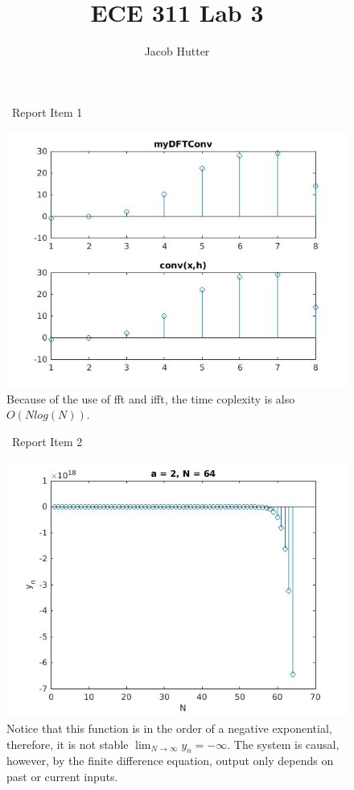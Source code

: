 \documentclass{article}
\author{Jacob Hutter}
\title{ECE 311 Lab 3}
\begin{document}
\maketitle

\begin{figure}[H]
\ Report Item 1

\includegraphics[scale = .5]{report1}
\\ Because of the use of fft and ifft, the time coplexity is also $O(Nlog(N))$.
\end{figure}



\begin{figure}[H]
\ Report Item 2

\includegraphics[scale = .5]{report2}
\\ Notice that this function is in the order of a negative exponential, 
therefore, it is not stable $\lim_{N\to\infty} y_n = -\infty$.
The system is causal, however, by the finite difference equation, output only 
depends on past or current inputs.
\end{figure}
\end{document}

